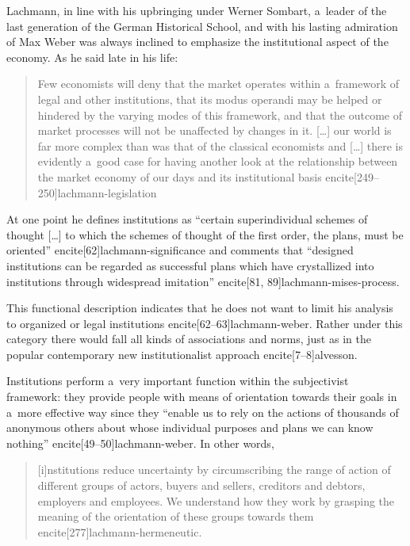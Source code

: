 {Lachmann, in line with his upbringing under Werner Sombart, a~leader of the last generation of the German Historical School, and with his lasting admiration of Max Weber was always inclined to emphasize the institutional aspect of the economy. As he said late in his life:

\begin{quote}

Few economists will deny that the market operates within a~framework of legal and other institutions, that its modus operandi may be helped or hindered by the varying modes of this framework, and that the outcome of market processes will not be unaffected by changes in it. [\ldots] our world is far more complex than was that of the classical economists and [\ldots] there is evidently a~good case for having another look at the relationship between the market economy of our days and its institutional basis encite[249--250]{lachmann-legislation}

\end{quote}

At one point he defines institutions as ``certain superindividual schemes of thought [\ldots] to which the schemes of thought of the first order, the plans, must be oriented'' encite[62]{lachmann-significance} and comments that ``designed institutions can be regarded as successful plans which have crystallized into institutions through widespread imitation'' encite[81, 89]{lachmann-mises-process}.

This functional description indicates that he does not want to limit his analysis to organized or legal institutions encite[62--63]{lachmann-weber}. Rather under this category there would fall all kinds of associations and norms, just as in the popular contemporary new institutionalist approach encite[7--8]{alvesson}.



Institutions perform a~very important function within the subjectivist framework: they provide people with means of orientation towards their goals in a~more effective way since they ``enable us to rely on the actions of thousands of anonymous others about whose individual purposes and plans we can know nothing'' encite[49--50]{lachmann-weber}. In other words,

\begin{quote}

[i]nstitutions reduce uncertainty by circumscribing the range of action of different groups of actors, buyers and sellers, creditors and debtors, employers and employees. We understand how they work by grasping the meaning of the orientation of these groups towards them encite[277]{lachmann-hermeneutic}.


\end{quote}}
